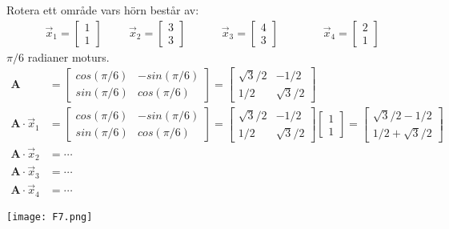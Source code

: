 \begin{Ex}
    Rotera ett område vars hörn består av:
    \begin{align*}
    &\vec{x}_1 = \begin{bmatrix} 1\\1 \end{bmatrix}
    &&&\vec{x}_2 = \begin{bmatrix} 3\\3 \end{bmatrix}
    &&&&\vec{x}_3 = \begin{bmatrix} 4\\3 \end{bmatrix}
    &&&&&\vec{x}_4 = \begin{bmatrix} 2\\1 \end{bmatrix}
    \end{align*}
    $\pi/6$ radianer moturs.
    \begin{align*}
    	\mathbf{A} &= \begin{bmatrix} cos(\pi/6)&-sin(\pi/6)\\sin(\pi/6)&cos(\pi/6)\end{bmatrix} = \begin{bmatrix} \sqrt{3}/2&-1/2\\1/2&\sqrt{3}/2 \end{bmatrix}\\
    	\mathbf{A} \cdot \vec{x}_1 &= \begin{bmatrix} cos(\pi/6)&-sin(\pi/6)\\sin(\pi/6)&cos(\pi/6)\end{bmatrix} = \begin{bmatrix} \sqrt{3}/2&-1/2\\1/2&\sqrt{3}/2 \end{bmatrix} \begin{bmatrix} 1\\1 \end{bmatrix} = \begin{bmatrix} \sqrt{3}/2-1/2\\1/2+\sqrt{3}/2 \end{bmatrix}\\
    	\mathbf{A} \cdot \vec{x}_2 &= \cdots \\
    	\mathbf{A} \cdot \vec{x}_3 &= \cdots\\
    	\mathbf{A} \cdot \vec{x}_4 &= \cdots
    \end{align*}
    \begin{center}
    	\texttt{[image: F7.png]}
    \end{center}
\end{Ex}
